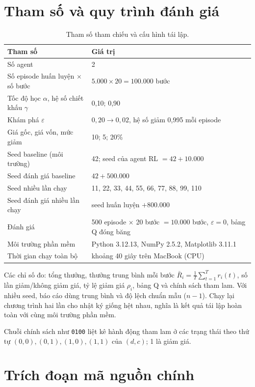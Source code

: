 \documentclass[12pt,a4paper]{report}
\begin{document}
\section{Tham số và quy trình đánh giá}
\begin{table}[H]
\centering
\small
\caption{Tham số tham chiếu và cấu hình tái lập.}
\label{tab:params}
\begin{tabular}{ll}
\toprule
Tham số & Giá trị \\
\midrule
Số agent & 2 \\
Số episode huấn luyện $\times$ số bước & $5.000\times20=100.000$ bước \\
Tốc độ học $\alpha$, hệ số chiết khấu $\gamma$ & 0{,}10; 0{,}90 \\
Khám phá $\varepsilon$ & $0{,}20\to0{,}02$, hệ số giảm 0{,}995 mỗi episode \\
Giá gốc, giá vốn, mức giảm & 10; 5; 20\% \\
Seed baseline (môi trường) & 42; seed của agent RL $=42+10.000$ \\
Seed đánh giá baseline & $42+500.000$ \\
Seed nhiều lần chạy & 11, 22, 33, 44, 55, 66, 77, 88, 99, 110 \\
Seed đánh giá nhiều lần chạy & seed huấn luyện $+800.000$ \\
Đánh giá & 500 episode $\times$ 20 bước $=10.000$ bước, $\varepsilon=0$, bảng Q đóng băng \\
Môi trường phần mềm & Python 3.12.13, NumPy 2.5.2, Matplotlib 3.11.1 \\
Thời gian chạy toàn bộ & khoảng 40 giây trên MacBook (CPU) \\
\bottomrule
\end{tabular}
\end{table}

Các chỉ số đo: tổng thưởng, thưởng trung bình mỗi bước
$\bar R_i=\frac1T\sum_{t=1}^{T}r_i(t)$, số lần giảm/không giảm giá, tỷ lệ giảm giá
$\rho_i$, bảng Q và chính sách tham lam. Với nhiều seed, báo cáo dùng trung bình và
độ lệch chuẩn mẫu ($n-1$). Chạy lại chương trình hai lần cho nhật ký giống hệt
nhau, nghĩa là kết quả tái lập hoàn toàn với cùng môi trường phần mềm.

Chuỗi chính sách như \texttt{0100} liệt kê hành động tham lam ở các trạng thái
theo thứ tự $(0,0),(0,1),(1,0),(1,1)$ của $(d,c)$; 1 là giảm giá.

\section{Trích đoạn mã nguồn chính}
\end{document}
